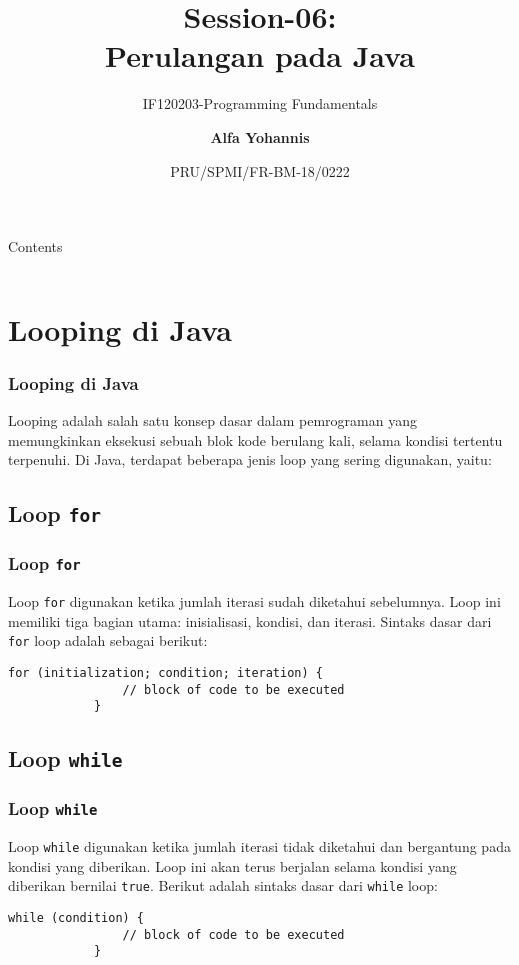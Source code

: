 \documentclass[aspectratio=169, table]{beamer}
\subtitle{IF120203-Programming Fundamentals}
\title{Session-06:\\\LARGE{Perulangan pada Java\\}
\vspace{10pt}}
\date[Serial]{\scriptsize {PRU/SPMI/FR-BM-18/0222}}
\author[Pradita]{\small{\textbf{Alfa Yohannis}}}
\begin{document}
\frame{\titlepage}

\begin{frame}[fragile]{Contents}
\vspace{15pt}
\begin{columns}[t]
\begin{column}{.5\textwidth}
\tableofcontents[sections={1-8}]
\end{column}
\begin{column}{.5\textwidth}
\tableofcontents[sections={9-20}]
\end{column}
\end{columns}
\end{frame}

	\section{Looping di Java}
	\begin{frame}
		\frametitle{Looping di Java}
		Looping adalah salah satu konsep dasar dalam pemrograman yang memungkinkan eksekusi sebuah blok kode berulang kali, selama kondisi tertentu terpenuhi. Di Java, terdapat beberapa jenis loop yang sering digunakan, yaitu:
	\end{frame}
	
	\subsection{Loop \texttt{for}}
	\begin{frame}[fragile]
		\frametitle{Loop \texttt{for}}
		Loop \texttt{for} digunakan ketika jumlah iterasi sudah diketahui sebelumnya. Loop ini memiliki tiga bagian utama: inisialisasi, kondisi, dan iterasi. Sintaks dasar dari \texttt{for} loop adalah sebagai berikut:
		\begin{lstlisting}[style=JavaStyle]
			for (initialization; condition; iteration) {
				// block of code to be executed
			}
		\end{lstlisting}
	\end{frame}
	
	\subsection{Loop \texttt{while}}
	\begin{frame}[fragile]
		\frametitle{Loop \texttt{while}}
		Loop \texttt{while} digunakan ketika jumlah iterasi tidak diketahui dan bergantung pada kondisi yang diberikan. Loop ini akan terus berjalan selama kondisi yang diberikan bernilai \texttt{true}. Berikut adalah sintaks dasar dari \texttt{while} loop:
		\begin{lstlisting}[style=JavaStyle]
			while (condition) {
				// block of code to be executed
			}
		\end{lstlisting}
	\end{frame}
	
\end{document}
